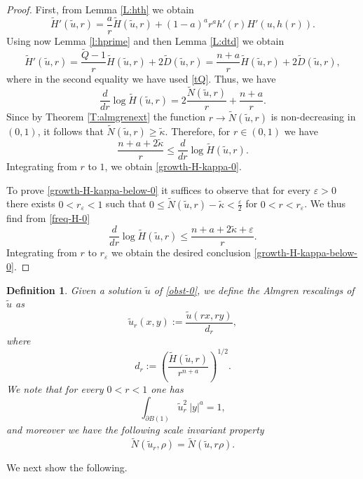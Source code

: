\documentclass[11pt]{amsart}
\theoremstyle{plain}
\newtheorem{dfn}[thrm]{Definition}
\numberwithin{equation}{section}
\begin{document}
\begin{proof}
First, from Lemma \ref{L:hth} we obtain
\[
\tilde H'(\tilde u,r) = \frac ar \tilde H(\tilde u,r) + (1-a)^a r^a h'(r) H'(u,h(r)).
\]
Using now Lemma \ref{l:hprime} and then Lemma \ref{L:dtd} we obtain
\[
\tilde H'(\tilde u,r)=\frac{\tilde Q -1}{r} \tilde H(\tilde u,r)+2\tilde D(\tilde u,r) = \frac{n+a}{r} \tilde H(\tilde u,r)+2\tilde D(\tilde u,r),
\]
where in the second equality we have used \eqref{tQ}.
Thus, we have
\begin{equation}\label{freq-H-0}
\frac{d}{dr}\log \tilde H(\tilde u,r)=2\frac{\tilde N(\tilde u,r)}{r}+\frac{n+a}{r}.
\end{equation}
Since by Theorem \ref{T:almgrenext} the function $r\to \tilde N(\tilde u,r)$ is non-decreasing in $(0,1)$, it follows that $\tilde N(\tilde u,r) \ge \tilde \kappa$. Therefore, for $r\in(0,1)$ we have
\[
\frac{n+a+2\tilde \kappa}{r}\leq \frac{d}{dr}\log \tilde H(\tilde u,r).
\]
Integrating from $r$ to $1$, we obtain \eqref{growth-H-kappa-0}.

To prove \eqref{growth-H-kappa-below-0} it suffices to observe that for every ${\varepsilon}>0$ there exists $0<r_{\varepsilon}<1$ such that $0\le \tilde N(\tilde u,r) - \tilde \kappa < \frac{\varepsilon}{2}$ for $0<r<r_{\varepsilon}$. We thus find from \eqref{freq-H-0}
\[
\frac{d}{dr}\log \tilde H(\tilde u,r) \le \frac{n+a+2\tilde \kappa + {\varepsilon}}{r}.
\]
Integrating from $r$ to $r_\varepsilon$ we obtain the desired conclusion \eqref{growth-H-kappa-below-0}.

\end{proof}

\begin{dfn}\label{D:almgrenres}
Given a solution $\tilde u$ of \eqref{obst-0}, we define the \emph{Almgren rescalings} of $\tilde u$ as
\[
\tilde u_r(x,y):=\frac{\tilde u(rx,ry)}{d_r},
\]
where
\[
d_r:=\left(\frac{\tilde H(\tilde u,r)}{r^{n+a}}\right)^{1/2}.
\]
We note that for every $0<r<1$ one has
\begin{equation}\label{tilde H_1}
\int_{{\partial} B(1)} \tilde u_r^2\ |y|^a = 1,
\end{equation}
and moreover we have the following scale invariant property
\begin{equation}\label{tilde N_scale}
\tilde N(\tilde u_r,\rho) = \tilde N(\tilde u,r\rho).
\end{equation}
\end{dfn}

We next show the following.
\end{document}
